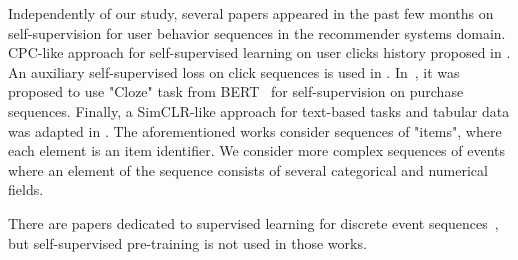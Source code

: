 \documentclass[sigconf]{acmart}
\newcommand{\GG}[1]{\textcolor{red}{[GG: #1]}}
\begin{document}


Independently of our study, several papers appeared in the past few months on self-supervision for user behavior sequences in the recommender systems domain.  CPC-like approach for self-supervised learning on user clicks history proposed in \cite{Zhou2020ContrastiveLF}. An auxiliary self-supervised loss on click sequences is used in \cite{Ma2020DisentangledSI}. 
In~\cite{Zhou2020S3RecSL}, it was proposed to use "Cloze" task from BERT~\citep{Devlin2019BERTPO} for self-supervision on purchase sequences. Finally, 
a SimCLR-like approach for text-based tasks and tabular data was adapted in \cite{Yao2020SelfsupervisedLF}. The aforementioned works consider sequences of "items", where each element is an item identifier. We consider more complex sequences of events where an element of the sequence consists of several categorical and numerical fields.

There are papers dedicated to supervised learning for discrete event sequences~\citep{Wiese2009CreditCT, Tobback2019RetailCS, Babaev2019ETRNNAD, chatterjee2003modeling, sinha2014your}, but self-supervised pre-training is not used in those works.
\end{document}
